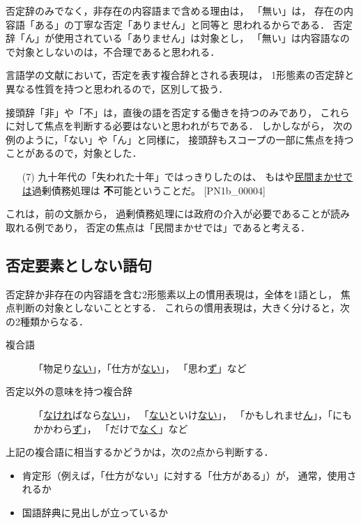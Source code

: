 \documentclass[japanese]{jnlp_1.4}
\begin{document}
否定辞のみでなく，非存在の内容語まで含める理由は，
「無い」は，
存在の内容語「ある」の丁寧な否定「ありません」と同等と
思われるからである．
否定辞「ん」が使用されている「ありません」は対象とし，
「無い」は内容語なので対象としないのは，不合理であると思われる．

言語学の文献\cite{morita1989,neg2007}において，否定を表す複合辞とされる表現は，
1形態素の否定辞と異なる性質を持つと思われるので，区別して扱う．

接頭辞「非」や「不」は，直後の語を否定する働きを持つのみであり，
これらに対して焦点を判断する必要はないと思われがちである．
しかしながら，
次の例のように，「ない」や「ん」と同様に，
接頭辞もスコープの一部に焦点を持つことがあるので，対象とした．
\begin{enumerate}
\item[(7)] 九十年代の「失われた十年」ではっきりしたのは、
  もはや\underline{民間まかせでは}過剰債務処理は
  \textbf{不}可能ということだ。 [PN1b\_00004]
\end{enumerate}
これは，前の文脈から，
過剰債務処理には政府の介入が必要であることが読み取れる例であり，
否定の焦点は「民間まかせでは」であると考える．


\subsection{否定要素としない語句}
\label{subsec:outof}

否定辞か非存在の内容語を含む2形態素以上の慣用表現は，全体を1語とし，
焦点判断の対象としないこととする．
これらの慣用表現は，大きく分けると，次の2種類からなる．
\begin{description}
\item[複合語] 「物足り\underline{ない}」，「仕方が\underline{ない}」，
  「思わ\underline{ず}」など
\item[否定以外の意味を持つ複合辞] 「\underline{なけれ}ばなら\underline{ない}」，
  「\underline{ない}といけ\underline{ない}」，
  「かもしれませ\underline{ん}」，「にもかかわら\underline{ず}」，
  「だけで\underline{なく}」など
\end{description}

上記の複合語に相当するかどうかは，次の2点から判断する．
\begin{itemize}
\item 肯定形（例えば，「仕方がない」に対する「仕方がある」）が，
  通常，使用されるか
\item 国語辞典\cite{daijisen,iwanami}に見出しが立っているか
\end{itemize}
\end{document}
